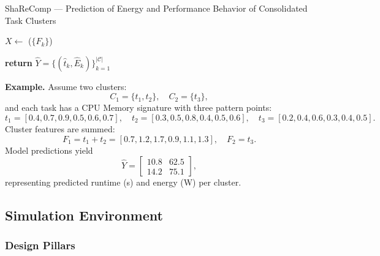 \begin{algorithm}[H]
    \caption{ShaReComp — Prediction of Energy and Performance Behavior of Consolidated Task Clusters}
    \label{alg:sharecomp_prediction}


    \BlankLine
    $X \gets$ \Build($\{F_k\}$) 

    \BlankLine
    \BlankLine
    \textbf{return } $\hat{Y} = \{ (\hat{t}_k, \hat{E}_k) \}_{k=1}^{|\mathcal{C}|}$
\end{algorithm}

\textbf{Example.}
Assume two clusters:
\[
    C_1 = \{t_1, t_2\}, \quad C_2 = \{t_3\},
\]
and each task has a CPU Memory signature with three pattern points:
\[
    t_1 = [0.4, 0.7, 0.9, 0.5, 0.6, 0.7], \quad
    t_2 = [0.3, 0.5, 0.8, 0.4, 0.5, 0.6], \quad
    t_3 = [0.2, 0.4, 0.6, 0.3, 0.4, 0.5].
\]
Cluster features are summed:
\[
    F_1 = t_1 + t_2 = [0.7, 1.2, 1.7, 0.9, 1.1, 1.3], \quad
    F_2 = t_3.
\]
Model predictions yield
\[
    \hat{Y} =
    \begin{bmatrix}
        10.8 & 62.5 \\
        14.2 & 75.1
    \end{bmatrix},
\]
representing predicted runtime (s) and energy (W) per cluster.

\subsection{Simulation Environment}
\label{sec:simulation_environment}

\subsubsection{Design Pillars}
\label{sec:design_pillars}


